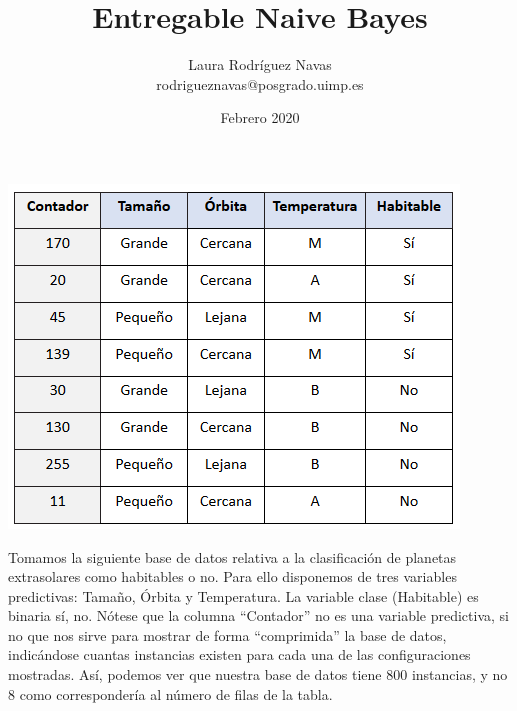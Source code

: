 \documentclass[11pt]{exam}
\title{Entregable Naive Bayes}
\author{Laura Rodríguez Navas \\ rodrigueznavas@posgrado.uimp.es}
\date{Febrero 2020}
\begin{document}
\maketitle

\centering
\includegraphics[scale=0.5]{img.png}

\justify
Tomamos la siguiente base de datos relativa a la clasificación de planetas extrasolares como habitables o no. Para ello disponemos de tres variables predictivas: Tamaño, Órbita y Temperatura. La variable clase (Habitable) es binaria {sí, no}. Nótese que la columna “Contador” no es una variable predictiva, si no que nos sirve para mostrar de forma “comprimida” la base de datos, indicándose cuantas instancias existen para cada una de las configuraciones mostradas. Así, podemos ver que nuestra base de datos tiene 800 instancias, y no 8 como correspondería al número de filas de la tabla.
\end{document}
